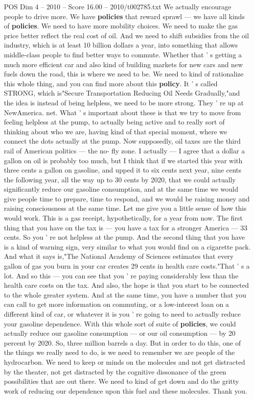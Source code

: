 \begin{textsample}{POS Dim 4 – 2010 – Score 16.00 – 2010/t002785.txt}
We actually encourage people to drive more.
We have \textbf{policies} that reward sprawl — we have all kinds of \textbf{policies}.
We need to have more mobility choices.
We need to make the gas price better reflect the real cost of oil.
And we need to shift subsidies from the oil industry, which is at least 10 billion dollars a year, into something that allows middle-class people to find better ways to commute.
Whether that ' s getting a much more efficient car and also kind of building markets for new cars and new fuels down the road, this is where we need to be.
We need to kind of rationalize this whole thing, and you can find more about this \textbf{policy}.
It ' s called STRONG, which is"Secure Transportation Reducing Oil Needs Gradually,"and the idea is instead of being helpless, we need to be more strong.
They ' re up at NewAmerica. net.
What ' s important about these is that we try to move from feeling helpless at the pump, to actually being active and to really sort of thinking about who we are, having kind of that special moment, where we connect the dots actually at the pump.
Now supposedly, oil taxes are the third rail of American politics — the no- fly zone.
I actually — I agree that a dollar a gallon on oil is probably too much, but I think that if we started this year with three cents a gallon on gasoline, and upped it to six cents next year, nine cents the following year, all the way up to 30 cents by 2020, that we could actually significantly reduce our gasoline consumption, and at the same time we would give people time to prepare, time to respond, and we would be raising money and raising consciousness at the same time.
Let me give you a little sense of how this would work.
This is a gas receipt, hypothetically, for a year from now.
The first thing that you have on the tax is — you have a tax for a stronger America — 33 cents.
So you ' re not helpless at the pump.
And the second thing that you have is a kind of warning sign, very similar to what you would find on a cigarette pack.
And what it says is,"The National Academy of Sciences estimates that every gallon of gas you burn in your car creates 29 cents in health care costs."That ' s a lot.
And so this — you can see that you ' re paying considerably less than the health care costs on the tax.
And also, the hope is that you start to be connected to the whole greater system.
And at the same time, you have a number that you can call to get more information on commuting, or a low-interest loan on a different kind of car, or whatever it is you ' re going to need to actually reduce your gasoline dependence.
With this whole sort of suite of \textbf{policies}, we could actually reduce our gasoline consumption — or our oil consumption — by 20 percent by 2020.
So, three million barrels a day.
But in order to do this, one of the things we really need to do, is we need to remember we are people of the hydrocarbon.
We need to keep or minds on the molecules and not get distracted by the theater, not get distracted by the cognitive dissonance of the green possibilities that are out there.
We need to kind of get down and do the gritty work of reducing our dependence upon this fuel and these molecules.
Thank you.


\end{textsample}
